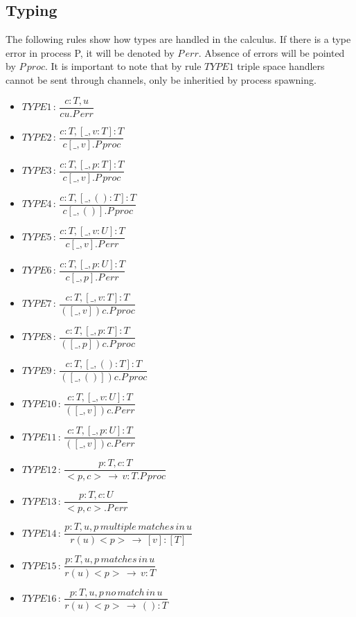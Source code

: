 \subsection{Typing}
The following rules show how types are handled in the calculus. If there is a type error in process P, it will be denoted by $P\,err$. Absence of errors will be pointed by $P\,proc$. It is important to note that by rule $TYPE1$ triple space handlers cannot be sent through channels, only be inheritied by process spawning.
\begin{itemize}
  \item $TYPE1\,:\,\dfrac{c:T,u}{cu.P\,err}$
  \item $TYPE2\,:\,\dfrac{c:T,[\_,v:T]:T}{c[\_,v].P\,proc}$
  \item $TYPE3\,:\,\dfrac{c:T,[\_,p:T]:T}{c[\_,v].P\,proc}$
  \item $TYPE4\,:\,\dfrac{c:T,[\_,():T]:T}{c[\_,()].P\,proc}$
  \item $TYPE5\,:\,\dfrac{c:T,[\_,v:U]:T}{c[\_,v].P\,err}$
  \item $TYPE6\,:\,\dfrac{c:T,[\_,p:U]:T}{c[\_,p].P\,err}$
  \item $TYPE7\,:\,\dfrac{c:T,[\_,v:T]:T}{([\_,v])c.P\,proc}$
  \item $TYPE8\,:\,\dfrac{c:T,[\_,p:T]:T}{([\_,p])c.P\,proc}$
  \item $TYPE9\,:\,\dfrac{c:T,[\_,():T]:T}{([\_,()])c.P\,proc}$
  \item $TYPE10\,:\,\dfrac{c:T,[\_,v:U]:T}{([\_,v])c.P\,err}$
  \item $TYPE11\,:\,\dfrac{c:T,[\_,p:U]:T}{([\_,v])c.P\,err}$
  \item $TYPE12\,:\,\dfrac{p:T,c:T}{<p,c>\,\rightarrow\,v:T.P\,proc}$
  \item $TYPE13\,:\,\dfrac{p:T,c:U}{<p,c>.P\,err}$
  \item $TYPE14\,:\,\dfrac{p:T,u,p\,multiple\,matches\,in\,u}{r(u)<p>\,\rightarrow\,[v]:[T]}$
  \item $TYPE15\,:\,\dfrac{p:T,u,p\,matches\,in\,u}{r(u)<p>\,\rightarrow\,v:T}$
  \item $TYPE16\,:\,\dfrac{p:T,u,p\,no\,match\,in\,u}{r(u)<p>\,\rightarrow\,():T}$
\end{itemize}
